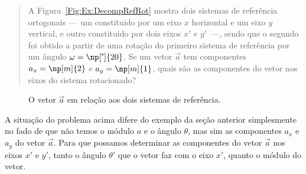 \begin{quote}
    A Figura~\ref{Fig:Ex:DecompRefRot} mostra dois sistemas de referência ortogonais ---~um constituido por um eixo $x$ horizontal e um eixo $y$ vertical, e outro constituido por dois eixos $x'$ e $y'$~---, sendo que o segundo foi obtido a partir de uma rotação do primeiro sistema de referência por um ângulo $\omega = \np[\tcdegree]{20}$. Se um vetor $\vec{a}$ tem componentes $a_x = \np[m]{2}$ e $a_y = \np[m]{1}$, quais são as componentes do vetor nos eixos do sistema rotacionado?
\end{quote}

\begin{figure}
\centering
{}
\caption{O vetor $\vec{a}$ em relação aos dois sistemas de referência. \label{Fig:Ex:DecompRefRotModAng}}
\end{figure}

A situação do problema acima difere do exemplo da seção anterior simplesmente no fado de que não temos o módulo $a$ e o ângulo $\theta$, mas sim as componentes $a_x$ e $a_y$ do vetor $\vec{a}$. 
Para que possamos determinar as componentes do vetor $\vec{a}$ nos eixos $x'$ e $y'$, tanto o ângulo $\theta'$ que o vetor faz com o eixo $x'$, quanto o módulo do vetor.

